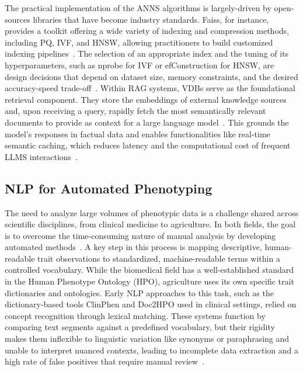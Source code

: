 \documentclass[journal]{./IEEE/IEEEtran}
\begin{document}
The practical implementation of the ANNS algorithms is largely-driven by open-sources libraries that have become industry standards. Faiss, for instance, provides a toolkit offering a wide variety of indexing and compression methods, including PQ, IVF, and HNSW, allowing practitioners to build customized indexing pipelines~\cite{douze_faiss_2025}. The selection of an appropriate index and the tuning of its hyperparameters, such as nprobe for IVF or efConstruction for HNSW, are design decisions that depend on dataset size, memory constraints, and the desired accuracy-speed trade-off~\cite{monir_vectorsearch_2024}. Within RAG systems, VDBs serve as the foundational retrieval component. They store the embeddings of external knowledge sources and, upon receiving a query, rapidly fetch the most semantically relevant documents to provide as context for a large language model~\cite{zhao_chat2data_2024}. This grounds the model's responses in factual data and enables functionalities like real-time semantic caching, which reduces latency and the computational cost of frequent LLMS interactions~\cite{zhao_chat2data_2024}.

\subsection{NLP for Automated Phenotyping}
The need to analyze large volumes of phenotypic data is a challenge shared across scientific disciplines, from clinical medicine to agriculture. In both fields, the goal is to overcome the time-consuming nature of manual analysis by developing automated methods~\cite{garcia_improving_2025, hier_simplified_2025}. A key step in this process is mapping descriptive, human-readable trait observations to standardized, machine-readable terms within a controlled vocabulary. While the biomedical field has a well-established standard in the Human Phenotype Ontology (HPO), agriculture uses its own specific trait dictionaries and ontologies. Early NLP approaches to this task, such as the dictionary-based tools ClinPhen and Doc2HPO used in clinical settings, relied on concept recognition through lexical matching. These systems function by comparing text segments against a predefined vocabulary, but their rigidity makes them inflexible to linguistic variation like synonyms or paraphrasing and unable to interpret nuanced contexts, leading to incomplete data extraction and a high rate of false positives that require manual review~\cite{garcia_improving_2025, yang_enhancing_2024}.
\end{document}
